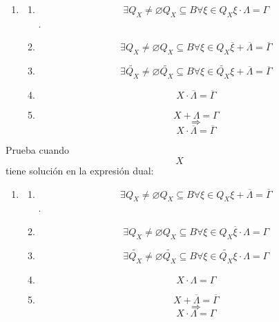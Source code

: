 \documentclass[
]{article}
\providecommand{\tightlist}{%
  \setlength{\itemsep}{0pt}\setlength{\parskip}{0pt}}
\begin{document}
\begin{enumerate}
\begin{enumerate}
\begin{enumerate}
\begin{enumerate}
\begin{enumerate}
          \begin{enumerate}
          \def\labelenumvi{\arabic{enumvi}.}
          \tightlist
          \item
            \begin{enumerate}
            \def\labelenumvii{\arabic{enumvii}.}
            \tightlist
            \item
              \[\exists{Q_{X} \neq \varnothing}{Q_{X} \subseteq B}\forall{\xi \in Q_{X}}{{\xi \cdot \Lambda} = \Gamma}\].
            \item
              \[\exists{Q_{X} \neq \varnothing}{Q_{X} \subseteq B}\forall{\xi \in Q_{X}}{{\overline{\xi} + \overline{\Lambda}} = \overline{\Gamma}}\]
            \item
              \[\exists{\widetilde{Q_{X}} \neq \varnothing}{\widetilde{Q_{X}} \subseteq B}\forall{\xi \in \widetilde{Q_{X}}}{{\xi + \overline{\Lambda}} = \overline{\Gamma}}\]
            \item
              \[{X \cdot \overline{\Lambda}} = \overline{\Gamma}\]
            \item
              \[{X + \Lambda} = \Gamma\] \[\Rightarrow\]
              \[{X \cdot \overline{\Lambda}} = \overline{\Gamma}\]
            \end{enumerate}
          \end{enumerate}

          Prueba cuando \[X\] tiene solución en la expresión dual:

          \begin{enumerate}
          \def\labelenumvi{\arabic{enumvi}.}
          \tightlist
          \item
            \begin{enumerate}
            \def\labelenumvii{\arabic{enumvii}.}
            \tightlist
            \item
              \[\exists{Q_{X} \neq \varnothing}{Q_{X} \subseteq B}\forall{\xi \in Q_{X}}{{\xi + \overline{\Lambda}} = \overline{\Gamma}}\].
            \item
              \[\exists{Q_{X} \neq \varnothing}{Q_{X} \subseteq B}\forall{\xi \in Q_{X}}{{\overline{\xi} \cdot \Lambda} = \Gamma}\]
            \item
              \[\exists{\widetilde{Q_{X}} \neq \varnothing}{\widetilde{Q_{X}} \subseteq B}\forall{\xi \in \widetilde{Q_{X}}}{{\xi \cdot \Lambda} = \Gamma}\]
            \item
              \[{X \cdot \Lambda} = \Gamma\]
            \item
              \[{X + \overline{\Lambda}} = \overline{\Gamma}\]
              \[\Rightarrow\] \[{X \cdot \Lambda} = \Gamma\]
            \end{enumerate}
          \end{enumerate}


\end{enumerate}
\end{enumerate}
\end{enumerate}
\end{enumerate}
\end{enumerate}
\end{document}

